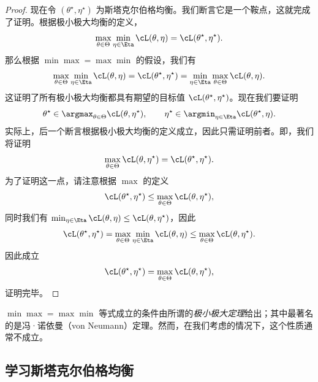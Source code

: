 \documentclass[../../book-main_zh.tex]{subfiles}
\begin{document}
\begin{proof}
    现在令 \((\theta^{\star}, \eta^{\star})\) 为斯塔克尔伯格均衡。我们断言它是一个鞍点，这就完成了证明。根据极小极大均衡的定义，
    \begin{equation}
        \max_{\theta \in \Theta}\min_{\eta \in \Eta}\cL(\theta, \eta)
        = \cL(\theta^{\star}, \eta^{\star}).
    \end{equation}
    那么根据 \(\min\max = \max\min\) 的假设，我们有
    \begin{equation}
        \max_{\theta \in \Theta}\min_{\eta \in \Eta}\cL(\theta, \eta)
        = \cL(\theta^{\star}, \eta^{\star}) = \min_{\eta \in
        \Eta}\max_{\theta \in \Theta}\cL(\theta, \eta).
    \end{equation}
    这证明了所有极小极大均衡都具有期望的目标值 \(\cL(\theta^{\star}, \eta^{\star})\)。现在我们要证明
    \begin{equation}
        \theta^{\star} \in \argmax_{\theta \in \Theta}\cL(\theta,
        \eta^{\star}), \qquad \eta^{\star} \in \argmin_{\eta \in
        \Eta}\cL(\theta^{\star}, \eta).
    \end{equation}
    实际上，后一个断言根据极小极大均衡的定义成立，因此只需证明前者。即，我们将证明
    \begin{equation}
        \max_{\theta \in \Theta}\cL(\theta, \eta^{\star}) =
        \cL(\theta^{\star}, \eta^{\star}).
    \end{equation}
    为了证明这一点，请注意根据 \(\max\) 的定义
    \begin{equation}
        \cL(\theta^{\star}, \eta^{\star}) \leq \max_{\theta \in
        \Theta}\cL(\theta, \eta^{\star}),
    \end{equation}
    同时我们有 \(\min_{\eta \in \Eta}\cL(\theta, \eta) \leq
    \cL(\theta, \eta^{\star})\)，因此
    \begin{equation}
        \cL(\theta^{\star}, \eta^{\star}) = \max_{\theta \in
        \Theta}\min_{\eta \in \Eta}\cL(\theta, \eta) \leq
        \max_{\theta \in \Theta}\cL(\theta, \eta^{\star}).
    \end{equation}
    因此成立
    \begin{equation}
        \cL(\theta^{\star}, \eta^{\star}) = \max_{\theta \in
        \Theta}\cL(\theta, \eta^{\star}),
    \end{equation}
    证明完毕。
\end{proof}
\(\min\max = \max\min\) 等式成立的条件由所谓的\textit{极小极大定理}给出；其中最著名的是冯·诺依曼（von Neumann）定理。然而，在我们考虑的情况下，这个性质通常不成立。

\subsection{学习斯塔克尔伯格均衡}
\end{document}
